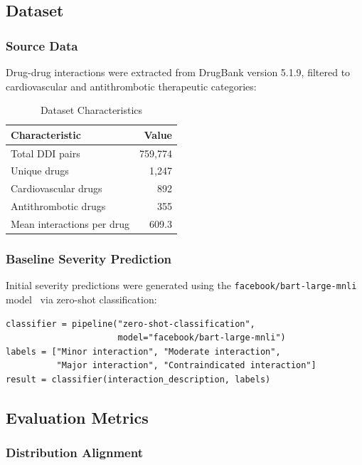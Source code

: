 \documentclass[11pt,a4paper]{article}
\begin{document}
\subsection{Dataset}

\subsubsection{Source Data}
Drug-drug interactions were extracted from DrugBank version 5.1.9, filtered to cardiovascular and antithrombotic therapeutic categories:

\begin{table}[H]
\centering
\caption{Dataset Characteristics}
\label{tab:dataset}
\begin{tabular}{@{}lr@{}}
\toprule
\textbf{Characteristic} & \textbf{Value} \\
\midrule
Total DDI pairs & 759,774 \\
Unique drugs & 1,247 \\
Cardiovascular drugs & 892 \\
Antithrombotic drugs & 355 \\
Mean interactions per drug & 609.3 \\
\bottomrule
\end{tabular}
\end{table}

\subsubsection{Baseline Severity Prediction}

Initial severity predictions were generated using the \texttt{facebook/bart-large-mnli} model~\citep{lewis2020bart} via zero-shot classification:

\begin{verbatim}
classifier = pipeline("zero-shot-classification",
                      model="facebook/bart-large-mnli")
labels = ["Minor interaction", "Moderate interaction",
          "Major interaction", "Contraindicated interaction"]
result = classifier(interaction_description, labels)
\end{verbatim}

\subsection{Evaluation Metrics}

\subsubsection{Distribution Alignment}
\end{document}
